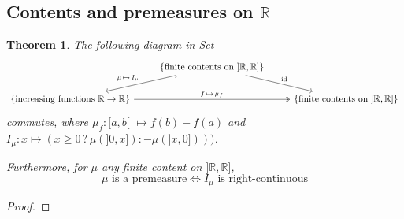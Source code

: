 \documentclass[11pt, a4paper, openany]{book}
\newtheorem{thm}{Theorem}\newtheorem{lem}{Lemma}\newtheorem{crl}{Corollary}
\theoremstyle{definition}
\DeclareMathOperator{\id}{id}
\newcommand{\cat}[1]{\textup{\textsf{#1}}}
\begin{document}
\subsection{Contents and premeasures on \texorpdfstring{$\mathbb{R}$}{R}}
    \begin{thm}
        The following diagram in \cat{Set}
        \[
            \begin{tikzcd}
                &\{\text{finite contents on }]\mathbb{R},\mathbb{R}]\} \ar[dr, "\id"] \ar[dl, hook, "\mu\,\mapsto\, I_\mu"'] & \\
                \{\text{increasing functions }\mathbb{R}\rightarrow\mathbb{R}\} \ar[rr, twoheadrightarrow, "f\,\mapsto\,\mu_f"]& & \{\text{finite contents on }]\mathbb{R},\mathbb{R}]\}
            \end{tikzcd}
        \]
        commutes, where $\mu_f:[a,b[\,\,\mapsto f(b)-f(a)$ and $I_\mu:x\mapsto (x\geqslant 0\,?\, \mu(]0{,}x]) : -\mu(]x{,}0])))$.

        Furthermore, for $\mu$ any finite content on $]\mathbb{R},\mathbb{R}]$,
        \[
            \mu\text{ is a premeasure} \Longleftrightarrow I_\mu\text{ is right-continuous}
        \]
    \end{thm}
    \begin{proof}
        
    \end{proof}
\end{document}
